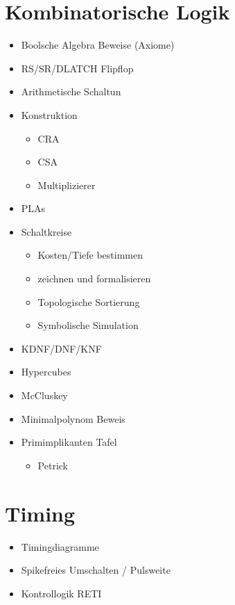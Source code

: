 \documentclass{scrartcl}[9pt, a4paper]
\begin{document}
\section*{Kombinatorische Logik}

\begin{itemize}
	\item Boolsche Algebra Beweise (Axiome)
	\item RS/SR/DLATCH Flipflop
	\item Arithmetische Schaltun
	\item Konstruktion
	      \begin{itemize}
	      	\item CRA
	      	\item CSA
	      	\item Multiplizierer
	      \end{itemize}
	\item PLAs
	\item Schaltkreise

	      \begin{itemize}
	      	\item Kosten/Tiefe bestimmen
	      	\item zeichnen und formalisieren
	      	\item Topologische Sortierung
	      	\item Symbolische Simulation
	      \end{itemize}

	\item KDNF/DNF/KNF
	\item Hypercubes
	\item McCluskey
	\item Minimalpolynom Beweis
	\item Primimplikanten Tafel
	      \begin{itemize}
	      	\item Petrick
	      \end{itemize}
\end{itemize}


\section*{Timing}

\begin{itemize}
	\item Timingdiagramme
	\item Spikefreies Umschalten / Pulsweite
	\item Kontrollogik RETI
\end{itemize}
\end{document}
